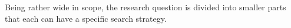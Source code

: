 Being rather wide in scope, the research question is divided into smaller parts
that each can have a specific search strategy.
